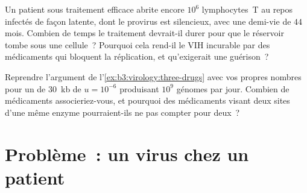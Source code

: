 \begin{exercise}[$\star\star\star$]\label{exo:b3:virology:11}
Un patient sous traitement efficace abrite encore $10^{6}$ lymphocytes~T
au repos infectés de façon latente, dont le provirus est silencieux,
avec une demi-vie de $44$ mois. Combien de temps le traitement
devrait-il durer pour que le réservoir tombe sous une cellule~?
Pourquoi cela rend-il le VIH incurable par des médicaments qui bloquent
la réplication, et qu'exigerait une guérison~?
\end{exercise}

\begin{exercise}[$\star\star\star$]\label{exo:b3:virology:12}
Reprendre l'argument de l'\cref{ex:b3:virology:three-drugs} avec vos
propres nombres pour un  de \qty{30}{kb} de $u = 10^{-6}$
produisant $10^{9}$ génomes par jour. Combien de médicaments
associeriez-vous, et pourquoi des médicaments visant deux sites d'une
même enzyme pourraient-ils ne pas compter pour deux~?
\end{exercise}

\section{Problème~: un virus chez un patient}

